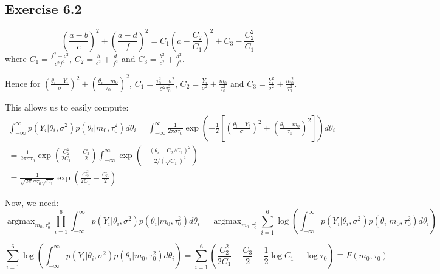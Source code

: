 \documentclass{article}
\newcommand{\argmax}{\mathop{\mathrm{argmax}}}
\begin{document}
\subsection*{Exercise 6.2}
\begin{flushleft}
\begin{equation}
\left(\frac{a - b}{c}\right)^{2} + \left(\frac{a - d}{f}\right)^{2} = C_{1}\left(a - \frac{C_{2}}{C_{1}}\right)^{2} + C_{3} - \frac{C_{2}^{2}}{C_{1}}
\end{equation}
where \(C_{1} = \frac{f^{2} + c^{2}}{c^{2}f^{2}}\), \(C_{2} = \frac{b}{c^{2}} + \frac{d}{f^{2}}\) and \(C_{3} = \frac{b^{2}}{c^{2}} + \frac{d^{2}}{f^{2}}\).

Hence for \(\left(\frac{\theta_{i} - Y_{i}}{\sigma}\right)^{2} + \left(\frac{\theta_{i} - m_{0}}{\tau_{0}}\right)^{2}\), \(C_{1} = \frac{\tau_{0}^{2} + \sigma^{2}}{\sigma^{2}\tau_{0}^{2}}\), \(C_{2} = \frac{Y_{i}}{\sigma^{2}} + \frac{m_{0}}{\tau_{0}^{2}}\) and \(C_{3} = \frac{Y_{i}^{2}}{\sigma^{2}} + \frac{m_{0}^{2}}{\tau_{0}^{2}}\).

This allows us to easily compute:
\begin{multline}
\int_{-\infty}^{\infty} p(Y_{i} | \theta_{i}, \sigma^{2}) p(\theta_{i} | m_{0}, \tau^{2}_{0}) d\theta_{i} = \int_{-\infty}^{\infty} \frac{1}{2\pi\sigma\tau_{0}} \exp\left(-\frac{1}{2}\left[\left(\frac{\theta_{i} - Y_{i}}{\sigma}\right)^{2} + \left(\frac{\theta_{i} - m_{0}}{\tau_{0}}\right)^{2}\right]\right) d\theta_{i}\\= \frac{1}{2\pi\sigma\tau_{0}}\exp\left(\frac{C_{2}^{2}}{2C_{1}} - \frac{C_{3}}{2}\right)\int_{-\infty}^{\infty} \exp\left(-\frac{(\theta_{i} - C_{2}/C_{1})^{2}}{2/(\sqrt{C_{1}})^{2}}\right)\\= \frac{1}{\sqrt{2\pi}\sigma\tau_{0}\sqrt{C_{1}}}\exp\left(\frac{C_{2}^{2}}{2C_{1}} - \frac{C_{3}}{2}\right)
\end{multline}

Now, we need:
\begin{equation}
\argmax_{m_{0}, \tau^{2}_{0}}\prod_{i=1}^{6} \int_{-\infty}^{\infty} p(Y_{i} | \theta_{i}, \sigma^{2}) p(\theta_{i} | m_{0}, \tau^{2}_{0}) d\theta_{i} = \argmax_{m_{0}, \tau^{2}_{0}} \sum_{i=1}^{6} \log \left(\int_{-\infty}^{\infty} p(Y_{i} | \theta_{i}, \sigma^{2}) p(\theta_{i} | m_{0}, \tau^{2}_{0}) d\theta_{i}\right)
\end{equation}

\begin{equation}
\sum_{i=1}^{6} \log \left(\int_{-\infty}^{\infty} p(Y_{i} | \theta_{i}, \sigma^{2}) p(\theta_{i} | m_{0}, \tau^{2}_{0}) d\theta_{i}\right) = \sum_{i=1}^{6} \left(\frac{C_{2}^{2}}{2C_{1}} - \frac{C_{3}}{2} - \frac{1}{2}\log C_{1} - \log \tau_{0}\right) \equiv F(m_{0}, \tau_{0})
\end{equation}


\end{flushleft}
\end{document}
